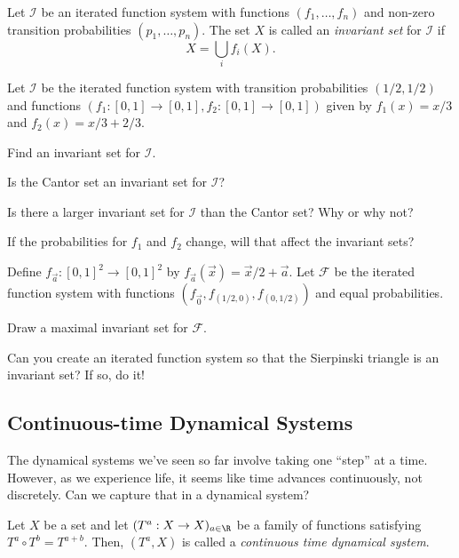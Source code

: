 	\begin{definition}
		Let $\mathcal I$ be an iterated function system with functions 
		$(f_1,\ldots,f_n)$ and non-zero transition probabilities $(p_1,\ldots,p_n)$.
		The set $X$ is called an \emph{invariant set} for $\mathcal I$ if
		\[
			X=\bigcup_i f_i(X).
		\]
	\end{definition}

	\question
	Let $\mathcal I$ be the iterated function system with transition probabilities $(1/2,1/2)$
	and functions $(f_1:[0,1]\to[0,1],f_2:[0,1]\to[0,1])$ given by
	$f_1(x)=x/3$ and $f_2(x)=x/3+2/3$.
	\begin{parts}
		\item Find an invariant set for $\mathcal I$.
		\item Is the Cantor set an invariant set for $\mathcal I$?
		\item Is there a larger invariant set for $\mathcal I$ than the Cantor set? Why or why not?
		\item If the probabilities for $f_1$ and $f_2$ change, will that affect the invariant sets?
	\end{parts}

	\question
	Define $f_{\vec a}:[0,1]^2\to[0,1]^2$ by $f_{\vec a}(\vec x)=\vec x/2 + \vec a$. Let $\mathcal F$ be
	the iterated function system with functions $(f_{\vec 0}, f_{(1/2,0)}, f_{(0,1/2)})$ and equal probabilities.
	\begin{parts}
		\item Draw a maximal invariant set for $\mathcal F$.
		\item Can you create an iterated function system so that the Sierpinski triangle is
			an invariant set? If so, do it!
	\end{parts}


	\newpage
	\subsection*{Continuous-time Dynamical Systems}
	The dynamical systems we've seen so far involve taking one ``step'' at a time.
	However, as we experience life, it seems like time advances continuously, not discretely.
	Can we capture that in a dynamical system?

	\begin{definition}
		Let $X$ be a set and let $(T^a:X\to X)_{a\in \R}$ be a family of functions
		satisfying $T^a\circ T^b=T^{a+b}$. Then, $(T^a,X)$ is called a \emph{continuous time
		dynamical system}.
	\end{definition}

